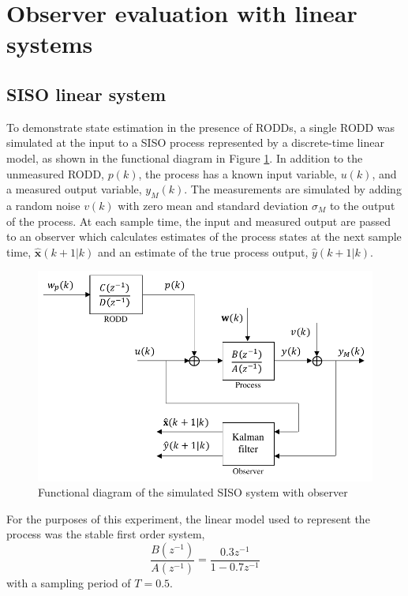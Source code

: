 \section{Observer evaluation with linear systems} \label{section:sim-obs-lin}

\subsection{SISO linear system} \label{sim-obs-lin-1}

To demonstrate state estimation in the presence of RODDs, a single RODD was simulated at the input to a SISO process represented by a discrete-time linear model, as shown in the functional diagram in Figure \ref{fig:sim-sys-diag-siso}. In addition to the unmeasured RODD, $p(k)$, the process has a known input variable, $u(k)$, and a measured output variable, $y_M(k)$. The measurements are simulated by adding a random noise $v(k)$ with zero mean and standard deviation $\sigma_M$ to the output of the process. At each sample time, the input and measured output are passed to an observer which calculates estimates of the process states at the next sample time, $\hat{\mathbf{x}}(k+1|k)$ and an estimate of the true process output, $\hat{y}(k+1|k)$.
\begin{figure}[htp]
	\centering
	\includegraphics[width=11.5cm]{images/sim-sys-diag-siso.pdf}
	\caption{Functional diagram of the simulated SISO system with observer}
	\label{fig:sim-sys-diag-siso}
\end{figure}

For the purposes of this experiment, the linear model used to represent the process was the stable first order system,
\begin{equation}
	\frac{B(z^{-1})}{A(z^{-1})} = \frac{0.3z^{-1}}{1-0.7z^{-1}}
\end{equation}
with a sampling period of $T=0.5$.

